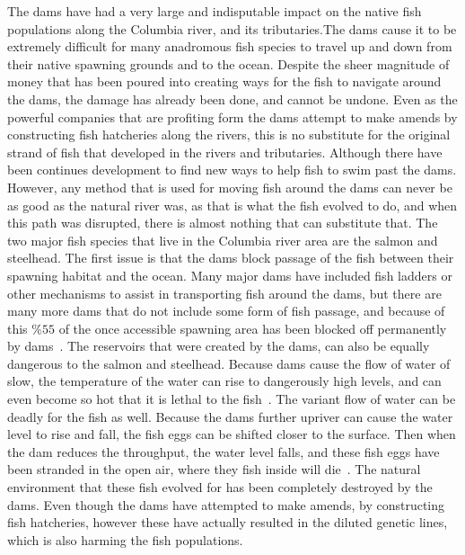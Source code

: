 \documentclass[12pt,twoside]{article}
\begin{document}
The dams have had a very large and indisputable impact on the native fish
populations along the Columbia river, and its tributaries.The dams cause it to
be extremely difficult for many anadromous fish species to travel up and down
from their native spawning grounds and to the ocean. Despite the sheer
magnitude of money that has been poured into creating ways for the fish to
navigate around the dams, the damage has already been done, and cannot be
undone. Even as the powerful companies that are profiting form the dams attempt
to make amends by constructing fish hatcheries along the rivers, this is no
substitute for the original strand of fish that developed in the rivers and
tributaries. Although there have been continues development to find new ways to
help fish to swim past the dams. However, any method that is used for moving
fish around the dams can never be as good as the natural river was, as that is
what the fish evolved to do, and when this path was disrupted, there is almost
nothing that can substitute that. The two major fish species that live in the
Columbia river area are the salmon and steelhead. The first issue is that the
dams block passage of the fish between their spawning habitat and the ocean.
Many major dams have included fish ladders or other mechanisms to assist in
transporting fish around the dams, but there are many more dams that do not
include some form of fish passage, and because of this $\%55$ of the once
accessible spawning area has been blocked off permanently by dams~\cite{SS}.
The reservoirs that were created by the dams, can also be equally dangerous to
the salmon and steelhead. Because dams cause the flow of water of slow, the
temperature of the water can rise to dangerously high levels, and can even
become so hot that it is lethal to the fish~\cite{SS}. The variant flow of
water can be deadly for the fish as well. Because the dams further upriver can
cause the water level to rise and fall, the fish eggs can be shifted closer to
the surface. Then when the dam reduces the throughput, the water level falls,
and these fish eggs have been stranded in the open air, where they fish inside
will die~\cite{SS}. The natural environment that these fish evolved for has
been completely destroyed by the dams. Even though the dams have attempted to
make amends, by constructing fish hatcheries, however these have actually
resulted in the diluted genetic lines, which is also harming the fish
populations.
\end{document}
